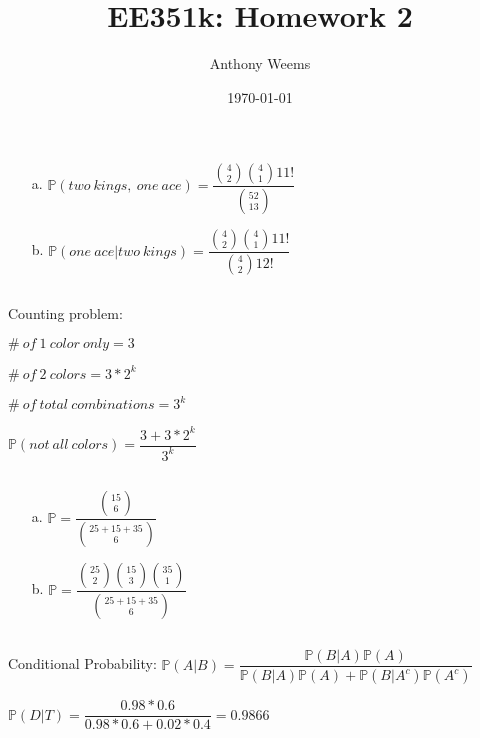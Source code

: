 \documentclass{article}
\begin{document}
\title{EE351k: Homework 2}
\author{Anthony Weems}
\date{\today}
\maketitle

\subsection{}
\begin{enumerate}
    \item[a.] \( \mathbb{P}(two~kings,~one~ace) = \dfrac{\binom{4}{2} \binom{4}{1} 11!}{\binom{52}{13}} \)
    \item[b.] \( \mathbb{P}(one~ace|two~kings) = \dfrac{\binom{4}{2} \binom{4}{1} 11!}{\binom{4}{2}12!} \)
\end{enumerate}

\subsection{}
Counting problem:

\( \#~of~1~color~only = 3 \)

\( \#~of~2~colors = 3*2^k \)

\( \#~of~total~combinations = 3^k \)

\( \mathbb{P}(not~all~colors) = \dfrac{3+3*2^k}{3^k} \)

\subsection{}

\begin{enumerate}
    \item[a.] \( \mathbb{P} = \dfrac{\binom{15}{6}}{\binom{25+15+35}{6}} \)
    \item[b.] \( \mathbb{P} = \dfrac{\binom{25}{2} \binom{15}{3} \binom{35}{1}}{\binom{25+15+35}{6}} \)
\end{enumerate}

\subsection{}
Conditional Probability: \( \mathbb{P}(A|B) = \dfrac{\mathbb{P}(B|A)\mathbb{P}(A)}{\mathbb{P}(B|A)\mathbb{P}(A) + \mathbb{P}(B|A^c)\mathbb{P}(A^c)} \)

\( \mathbb{P}(D|T) = \dfrac{0.98*0.6}{0.98*0.6 + 0.02*0.4} = 0.9866 \)
\end{document}
